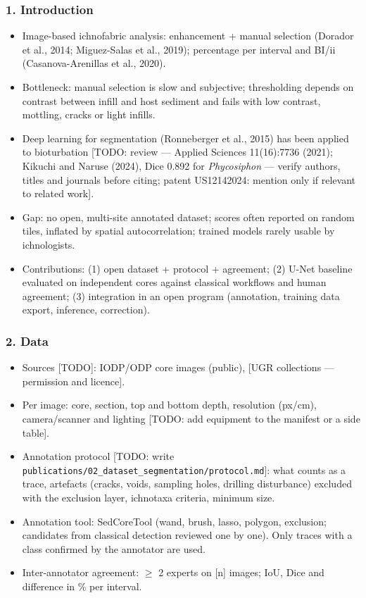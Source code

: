 \documentclass[
  10pt,
]{article}
\providecommand{\tightlist}{%
  \setlength{\itemsep}{0pt}\setlength{\parskip}{0pt}}
\begin{document}
\hypertarget{introduction}{%
\subsubsection{1. Introduction}\label{introduction}}

\begin{itemize}
\tightlist
\item
  Image-based ichnofabric analysis: enhancement + manual selection
  (Dorador et al., 2014; Miguez-Salas et al., 2019); percentage per
  interval and BI/ii (Casanova-Arenillas et al., 2020).
\item
  Bottleneck: manual selection is slow and subjective; thresholding
  depends on contrast between infill and host sediment and fails with
  low contrast, mottling, cracks or light infills.
\item
  Deep learning for segmentation (Ronneberger et al., 2015) has been
  applied to bioturbation {[}TODO: review --- Applied Sciences
  11(16):7736 (2021); Kikuchi and Naruse (2024), Dice 0.892 for
  \emph{Phycosiphon} --- verify authors, titles and journals before
  citing; patent US12142024: mention only if relevant to related
  work{]}.
\item
  Gap: no open, multi-site annotated dataset; scores often reported on
  random tiles, inflated by spatial autocorrelation; trained models
  rarely usable by ichnologists.
\item
  Contributions: (1) open dataset + protocol + agreement; (2) U-Net
  baseline evaluated on independent cores against classical workflows
  and human agreement; (3) integration in an open program (annotation,
  training data export, inference, correction).
\end{itemize}

\hypertarget{data}{%
\subsubsection{2. Data}\label{data}}

\begin{itemize}
\tightlist
\item
  Sources {[}TODO{]}: IODP/ODP core images (public), {[}UGR collections
  --- permission and licence{]}.
\item
  Per image: core, section, top and bottom depth, resolution (px/cm),
  camera/scanner and lighting {[}TODO: add equipment to the manifest or
  a side table{]}.
\item
  Annotation protocol {[}TODO: write
  \texttt{publications/02\_dataset\_segmentation/protocol.md}{]}: what
  counts as a trace, artefacts (cracks, voids, sampling holes, drilling
  disturbance) excluded with the exclusion layer, ichnotaxa criteria,
  minimum size.
\item
  Annotation tool: SedCoreTool (wand, brush, lasso, polygon, exclusion;
  candidates from classical detection reviewed one by one). Only traces
  with a class confirmed by the annotator are used.
\item
  Inter-annotator agreement: $\geq$ 2 experts on {[}n{]} images; IoU, Dice
  and difference in \% per interval.
\end{itemize}
\end{document}
